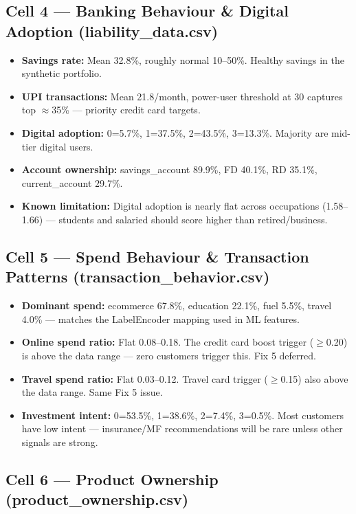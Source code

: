 \documentclass[12pt,a4paper]{article}
\begin{document}
\subsection{Cell 4 — Banking Behaviour \& Digital Adoption (liability\_data.csv)}

\begin{itemize}[leftmargin=*,itemsep=2pt]
  \item \textbf{Savings rate:} Mean 32.8\%, roughly normal 10--50\%. Healthy savings in the synthetic portfolio.
  \item \textbf{UPI transactions:} Mean 21.8/month, power-user threshold at 30 captures top $\approx$35\% — priority credit card targets.
  \item \textbf{Digital adoption:} 0=5.7\%, 1=37.5\%, 2=43.5\%, 3=13.3\%. Majority are mid-tier digital users.
  \item \textbf{Account ownership:} savings\_account 89.9\%, FD 40.1\%, RD 35.1\%, current\_account 29.7\%.
  \item \textbf{Known limitation:} Digital adoption is nearly flat across occupations (1.58--1.66) — students and salaried should score higher than retired/business.
\end{itemize}

\subsection{Cell 5 — Spend Behaviour \& Transaction Patterns (transaction\_behavior.csv)}

\begin{itemize}[leftmargin=*,itemsep=2pt]
  \item \textbf{Dominant spend:} ecommerce 67.8\%, education 22.1\%, fuel 5.5\%, travel 4.0\% — matches the LabelEncoder mapping used in ML features.
  \item \textbf{Online spend ratio:} Flat 0.08--0.18. The credit card boost trigger ($\geq$0.20) is above the data range — zero customers trigger this. Fix 5 deferred.
  \item \textbf{Travel spend ratio:} Flat 0.03--0.12. Travel card trigger ($\geq$0.15) also above the data range. Same Fix 5 issue.
  \item \textbf{Investment intent:} 0=53.5\%, 1=38.6\%, 2=7.4\%, 3=0.5\%. Most customers have low intent — insurance/MF recommendations will be rare unless other signals are strong.
\end{itemize}

\subsection{Cell 6 — Product Ownership (product\_ownership.csv)}
\end{document}
